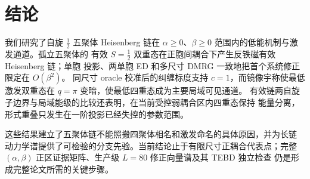 \section{结论}

我们研究了自旋 $\frac{1}{2}$ 五聚体 Heisenberg 链在
$\alpha\geq0$、$\beta\geq0$ 范围内的低能机制与激发通道。孤立五聚体的
有效 $S=\frac12$ 双重态在正胞间耦合下产生反铁磁有效 Heisenberg 链；单胞
投影、两单胞 ED 和多尺寸 DMRG 一致地把首个系统修正限定在 $O(\beta^2)$。
同尺寸 oracle 校准后的纠缠标度支持 $c=1$，而镜像宇称使最低激发双重态在
$q=\pi$ 变暗，使最低四重态成为主要局域可见通道。
有效链两自旋子边界与局域能级的比较还表明，在当前受控弱耦合区内四重态保持
能量分离，形式重叠只发生在一阶投影已经失控的参数范围。

这些结果建立了五聚体链不能照搬四聚体相名和激发命名的具体原因，并为长链
动力学谱提供了可检验的分支先验。当前结论止于有限尺寸正耦合代表点；完整
$(\alpha,\beta)$ 正区证据矩阵、生产级 $L=80$ 修正向量谱及其 TEBD 独立检查
仍是形成完整论文所需的关键步骤。
